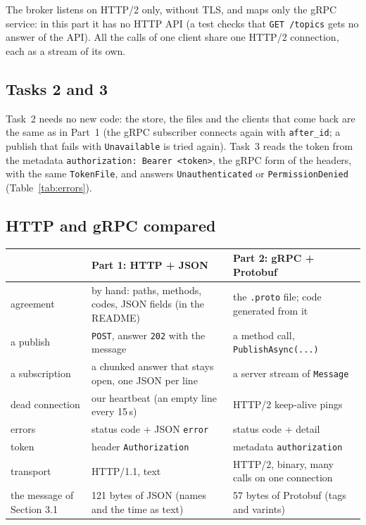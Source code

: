 \documentclass[11pt,a4paper]{article}
\newcommand{\code}[1]{{\frenchspacing\texttt{#1}}}
\begin{document}
The broker listens on HTTP/2 only, without TLS, and maps only the gRPC service: in this part it has
no HTTP API (a test checks that \code{GET /topics} gets no answer of the API). All the calls of
one client share one HTTP/2 connection, each as a stream of its own.

\subsection{Tasks 2 and 3}

Task~2 needs no new code: the store, the files and the clients that come back are the same as in
Part~1 (the gRPC subscriber connects again with \code{after\_id}; a publish that fails with
\code{Unavailable} is tried again). Task~3 reads the token from the metadata
\code{authorization: Bearer <token>}, the gRPC form of the headers, with the same \code{TokenFile},
and answers \code{Unauthenticated} or \code{PermissionDenied} (Table~\ref{tab:errors}).

\subsection{HTTP and gRPC compared}

\begin{center}
\small
\begin{tabularx}{\linewidth}{@{}lXX@{}}
\toprule
 & Part 1: HTTP + JSON & Part 2: gRPC + Protobuf \\
\midrule
agreement & by hand: paths, methods, codes, JSON fields (in the README) & the \code{.proto} file; code generated from it \\
a publish & \code{POST}, answer \code{202} with the message & a method call, \code{PublishAsync(...)} \\
a subscription & a chunked answer that stays open, one JSON per line & a server stream of \code{Message} \\
dead connection & our heartbeat (an empty line every 15\,s) & HTTP/2 keep-alive pings \\
errors & status code + JSON \code{error} & status code + detail \\
token & header \code{Authorization} & metadata \code{authorization} \\
transport & HTTP/1.1, text & HTTP/2, binary, many calls on one connection \\
the message of Section 3.1 & 121 bytes of JSON (names and the time as text) & 57 bytes of Protobuf (tags and varints) \\
\bottomrule
\end{tabularx}
\end{center}
\end{document}
